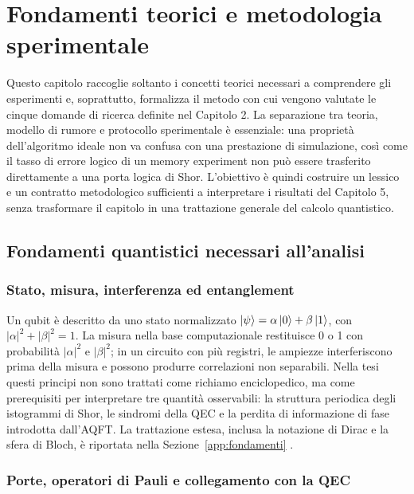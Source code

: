 \chapter{Fondamenti teorici e metodologia sperimentale}
\label{chap:quadro}
\label{chap:shor}
\label{chap:rumore}
\label{chap:strategie}
\label{chap:metodologia}
\label{chap:fondamenti}


Questo capitolo raccoglie soltanto i concetti teorici necessari a comprendere gli esperimenti e, soprattutto, formalizza il metodo con cui vengono valutate le cinque domande di ricerca definite nel Capitolo 2. La separazione tra teoria, modello di rumore e protocollo sperimentale è essenziale: una proprietà dell'algoritmo ideale non va confusa con una prestazione di simulazione, così come il tasso di errore logico di un memory experiment non può essere trasferito direttamente a una porta logica di Shor. L'obiettivo è quindi costruire un lessico e un contratto metodologico sufficienti a interpretare i risultati del Capitolo 5, senza trasformare il capitolo in una trattazione generale del calcolo quantistico.


\section{Fondamenti quantistici necessari all'analisi}\label{sec:finale_3_1}

\subsection{Stato, misura, interferenza ed entanglement}\label{sec:finale_3_1_1}

Un qubit è descritto da uno stato normalizzato $\ket{\psi}=\alpha\ket{0}+\beta\ket{1}$, con $|\alpha|^2+|\beta|^2=1$. La misura nella base computazionale restituisce 0 o 1 con probabilità $|\alpha|^2$ e $|\beta|^2$; in un circuito con più registri, le ampiezze interferiscono prima della misura e possono produrre correlazioni non separabili. Nella tesi questi principi non sono trattati come richiamo enciclopedico, ma come prerequisiti per interpretare tre quantità osservabili: la struttura periodica degli istogrammi di Shor, le sindromi della QEC e la perdita di informazione di fase introdotta dall'AQFT. La trattazione estesa, inclusa la notazione di Dirac e la sfera di Bloch, è riportata nella Sezione~\ref{app:fondamenti} \cite{nielsenChuang2000,wootters1982}.

\subsection{Porte, operatori di Pauli e collegamento con la QEC}\label{sec:finale_3_1_2}

